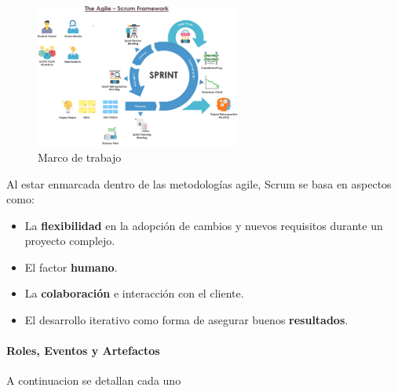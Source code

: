 \documentclass[12pt, letterpaper]{article}
\begin{document}
\vspace{10pt} %

\begin{figure}[ht] %
    \centering
    \includegraphics[width=0.6\textwidth]{imagenes/scrum.png}
    \caption{Marco de trabajo}
    \label{fig:scrum}
  \end{figure}

\vspace{10pt} %

Al estar enmarcada dentro de las metodologías agile, Scrum se basa en aspectos como:
\begin{itemize}
    \item La \textbf{flexibilidad} en la adopción de cambios y nuevos requisitos durante un proyecto complejo.
    \item El factor \textbf{humano}.
    \item La \textbf{colaboración} e interacción con el cliente.
    \item El desarrollo iterativo como forma de asegurar buenos \textbf{resultados}.
\end{itemize}

\paragraph{Roles, Eventos y Artefactos}\textrightarrow{} A continuacion se detallan cada uno

\end{document}
